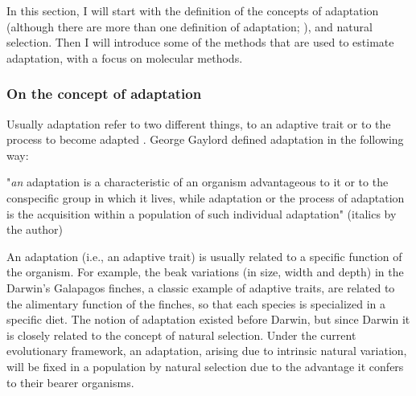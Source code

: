 
In this section, I will start with the definition of the concepts of adaptation (although there are more than one definition of adaptation; \citealp{endler1986natural}), and natural selection. Then I will introduce some of the methods that are used to estimate adaptation, with a focus on molecular methods.

\subsubsection{On the concept of adaptation}
Usually adaptation refer to two different things, to an adaptive trait or to the process to become adapted \citep{endler1986natural}.
George Gaylord \citet{Simpson1953} defined adaptation in the following way: 

"\textit{an} adaptation is a characteristic of an organism advantageous to it or to the conspecific group in which it lives, while adaptation or the process of adaptation is the acquisition within a population of such individual adaptation" (italics by the author)

An adaptation (i.e., an adaptive trait) is usually related to a specific function of the organism. For example, the beak variations (in size, width and depth) in the Darwin's Galapagos finches, a classic example of adaptive traits, are related to the alimentary function of the finches, so that each species is specialized in a specific diet.
The notion of adaptation existed before Darwin, but since Darwin it is closely related to the concept of natural selection. Under the current evolutionary framework, an adaptation, arising due to intrinsic natural variation, will be fixed in a population by natural selection due to the advantage it confers to their bearer organisms.

%
%


